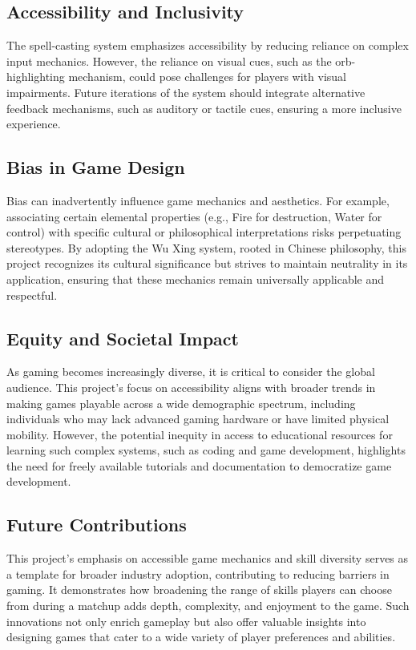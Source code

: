 \documentclass[10pt,twocolumn]{article}
\begin{document}
\subsection{Accessibility and Inclusivity} The spell-casting system emphasizes accessibility by reducing reliance on complex input mechanics. However, the reliance on visual cues, such as the orb-highlighting mechanism, could pose challenges for players with visual impairments. Future iterations of the system should integrate alternative feedback mechanisms, such as auditory or tactile cues, ensuring a more inclusive experience.

\subsection{Bias in Game Design} Bias can inadvertently influence game mechanics and aesthetics. For example, associating certain elemental properties (e.g., Fire for destruction, Water for control) with specific cultural or philosophical interpretations risks perpetuating stereotypes. By adopting the Wu Xing system, rooted in Chinese philosophy, this project recognizes its cultural significance but strives to maintain neutrality in its application, ensuring that these mechanics remain universally applicable and respectful.

\subsection{Equity and Societal Impact} As gaming becomes increasingly diverse, it is critical to consider the global audience. This project’s focus on accessibility aligns with broader trends in making games playable across a wide demographic spectrum, including individuals who may lack advanced gaming hardware or have limited physical mobility. However, the potential inequity in access to educational resources for learning such complex systems, such as coding and game development, highlights the need for freely available tutorials and documentation to democratize game development.

\subsection{Future Contributions} This project’s emphasis on accessible game mechanics and skill diversity serves as a template for broader industry adoption, contributing to reducing barriers in gaming. It demonstrates how broadening the range of skills players can choose from during a matchup adds depth, complexity, and enjoyment to the game. Such innovations not only enrich gameplay but also offer valuable insights into designing games that cater to a wide variety of player preferences and abilities.
\end{document}

